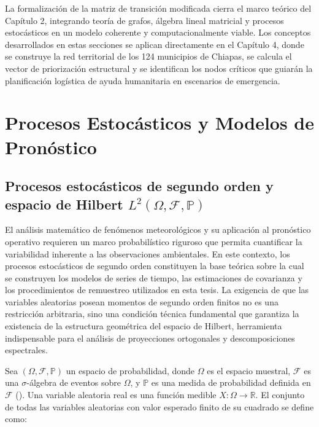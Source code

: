 \documentclass[
  spanish,
  us-letterpaper,
]{scrreprt}
\numberwithin{equation}{section}
\begin{document}
La formalización de la matriz de transición modificada cierra el marco
teórico del Capítulo 2, integrando teoría de grafos, álgebra lineal
matricial y procesos estocásticos en un modelo coherente y
computacionalmente viable. Los conceptos desarrollados en estas
secciones se aplican directamente en el Capítulo 4, donde se construye
la red territorial de los 124 municipios de Chiapas, se calcula el
vector de priorización estructural y se identifican los nodos críticos
que guiarán la planificación logística de ayuda humanitaria en
escenarios de emergencia.


\chapter{Procesos Estocásticos y Modelos de
Pronóstico}\label{procesos-estocuxe1sticos-y-modelos-de-pronuxf3stico}

\section{\texorpdfstring{Procesos estocásticos de segundo orden y
espacio de Hilbert
\(L^2(\Omega,\mathcal{F},\mathbb{P})\)}{Procesos estocásticos de segundo orden y espacio de Hilbert L\^{}2(\textbackslash Omega,\textbackslash mathcal\{F\},\textbackslash mathbb\{P\})}}\label{sec-estocasticossegundo}

El análisis matemático de fenómenos meteorológicos y su aplicación al
pronóstico operativo requieren un marco probabilístico riguroso que
permita cuantificar la variabilidad inherente a las observaciones
ambientales. En este contexto, los procesos estocásticos de segundo
orden constituyen la base teórica sobre la cual se construyen los
modelos de series de tiempo, las estimaciones de covarianza y los
procedimientos de remuestreo utilizados en esta tesis. La exigencia de
que las variables aleatorias posean momentos de segundo orden finitos no
es una restricción arbitraria, sino una condición técnica fundamental
que garantiza la existencia de la estructura geométrica del espacio de
Hilbert, herramienta indispensable para el análisis de proyecciones
ortogonales y descomposiciones espectrales.

Sea \((\Omega, \mathcal{F}, \mathbb{P})\) un espacio de probabilidad,
donde \(\Omega\) es el espacio muestral, \(\mathcal{F}\) es una
\(\sigma\)-álgebra de eventos sobre \(\Omega\), y \(\mathbb{P}\) es una
medida de probabilidad definida en \(\mathcal{F}\)
(). Una variable
aleatoria real es una función medible \(X: \Omega \to \mathbb{R}\). El
conjunto de todas las variables aleatorias con valor esperado finito de
su cuadrado se define como:
\end{document}
